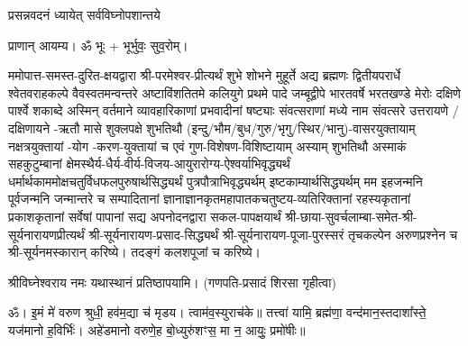 




{प्रसन्नवदनं ध्यायेत् सर्वविघ्नोपशान्तये}

प्राणान् आयम्य। ॐ भूः + भूर्भुवः॒ सुव॒रोम्।


ममोपात्त-समस्त-दुरित-क्षयद्वारा श्री-परमेश्वर-प्रीत्यर्थं शुभे शोभने मुहूर्ते अद्य ब्रह्मणः
द्वितीयपरार्धे श्वेतवराहकल्पे वैवस्वतमन्वन्तरे अष्टाविंशतितमे कलियुगे प्रथमे पादे
जम्बूद्वीपे भारतवर्षे भरतखण्डे मेरोः दक्षिणे पार्श्वे शकाब्दे अस्मिन् वर्तमाने व्यावहारिकाणां
प्रभवादीनां षष्ट्याः संवत्सराणां मध्ये \blank{} नाम संवत्सरे उत्तरायणे / दक्षिणायने \blank-ऋतौ \blank{} मासे
शुक्लपक्षे \blank{} शुभतिथौ (इन्दु/भौम/बुध/गुरु/भृगु/स्थिर/भानु)-वासरयुक्तायाम्
\blank{} नक्षत्रयुक्तायां \blank-योग \blank-करण-युक्तायां च एवं गुण-विशेषण-विशिष्टायाम्
अस्याम् \blank{} शुभतिथौ अस्माकं सहकुटुम्बानां क्षेमस्थैर्य-धैर्य-वीर्य-विजय-आयुरारोग्य-ऐश्वर्याभिवृद्ध्यर्थं धर्मार्थकाममोक्ष\-चतुर्विधफलपुरुषार्थसिद्ध्यर्थं पुत्रपौत्राभिवृद्ध्यर्थम् इष्टकाम्यार्थसिद्ध्यर्थम्
मम इहजन्मनि पूर्वजन्मनि जन्मान्तरे च सम्पादितानां ज्ञानाज्ञानकृतमहा\-पातकचतुष्टय-व्यतिरिक्तानां रहस्यकृतानां प्रकाशकृतानां सर्वेषां पापानां सद्य अपनोदनद्वारा सकल-पापक्षयार्थं
श्री-छाया-सुवर्चलाम्बा-समेत-श्री-सूर्यनारायणप्रीत्यर्थं
श्री-सूर्यनारायण-प्रसाद-सिद्ध्यर्थं श्री-सूर्यनारायण-पूजा-पुरस्सरं तृचकल्पेन अरुणप्रश्नेन च श्री-सूर्यनमस्कारान् करिष्ये। तदङ्गं कलशपूजां च करिष्ये।

श्रीविघ्नेश्वराय नमः यथास्थानं प्रतिष्ठापयामि।
(गणपति-प्रसादं शिरसा गृहीत्वा)














ॐ। इ॒मं मे॑ वरुण श्रुधी॒ हव॑म॒द्या च॑ मृडय। त्वाम॑व॒स्युराच॑के॥ तत्त्वा॑ यामि॒ ब्रह्म॑णा॒ वन्द॑मान॒स्तदाशा᳚स्ते॒ यज॑मानो ह॒विर्भिः॑। अहे॑डमानो वरुणे॒ह बो॒ध्युरु॑शꣳस॒ मा न॒ आयुः॒ प्रमो॑षीः॥

